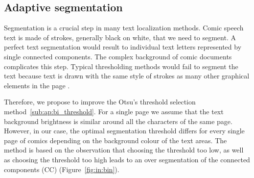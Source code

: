 

\subsection{Adaptive segmentation}
\label{sec:te:segmentation}
Segmentation is a crucial step in many text localization methods.
Comic speech text is made of strokes, generally black on white, that we need to segment.
A perfect text segmentation would result to individual text letters represented by single connected components.
The complex background of comic documents complicates this step.
Typical thresholding methods would fail to segment the text because text is drawn with the same style of strokes as many other graphical elements in the page .

Therefore, we propose to improve the Otsu's threshold selection method~\ref{sub:ap:bi_threshold}.
For a single page we assume that the text background brightness is similar around all the characters of the same page. However, in our case, the optimal segmentation threshold differs for every single page of comics depending on the background colour of the text areas. The method is based on the observation that choosing the threshold too low, as well as choosing the threshold too high leads to an over segmentation of the connected components (CC) (Figure~\ref{fig:in:bin}).

